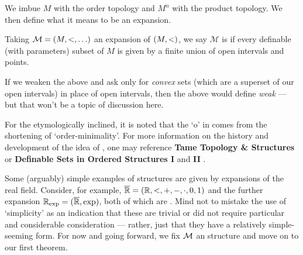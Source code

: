 We imbue $M$ with the order topology and $M^n$ with the product topology. We then define what it means to be an \om expansion.

\begin{definition}[\Om expansion]
  Taking $\mathcal{M} = (M, <, \hdots)$ an expansion of $(M, <)$, we say $\mathcal{M}$ is \om if every definable (with parameters) subset of $M$ is given by a finite union of open intervals and points.
\end{definition}

\begin{svgraybox}
  If we weaken the above and ask only for \emph{convex} sets (which are a superset of our open intervals) in place of open intervals, then the above would define \emph{weak \omy} — but that won't be a topic of discussion here.
\end{svgraybox}

For the etymologically inclined, it is noted that the `o' in \om comes from the shortening of `order-minimality'. For more information on the history and development of the idea of \omy, one may reference
\textbf{Tame Topology \& \Om Structures} \cite{dries_tame_1998} or \textbf{Definable Sets in Ordered Structures I} \cite{pillay_definable_1986} and \textbf{II} \cite{knight_definable_1986}.


Some (arguably) simple examples of \om structures are given by expansions of the real field. Consider, for example, $\overline{\mathbb{R}} = (\mathbb{R}, <, +, -, \cdot, 0, 1)$ and the further expansion $\mathbb{R}_{\textrm{exp}} = (\overline{\mathbb{R}}, \exp)$, both of which are \om. Mind not to mistake the use of `simplicity' as an indication that these are trivial or did not require particular and considerable consideration — rather, just that they have a relatively simple-seeming form. For now and going forward, we fix $\mathcal{M}$ an \om structure and move on to our first theorem.


%
